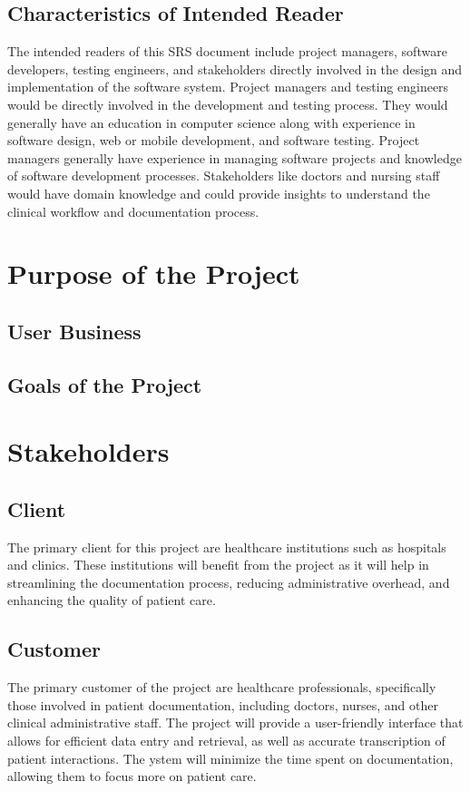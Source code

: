 \documentclass[12pt]{article}
\begin{document}
\subsection{Characteristics of Intended Reader} \label{sec_IntendedReader} 

The intended readers of this SRS document include project managers, software developers, testing engineers, and stakeholders directly involved in the design and implementation of the software system. Project managers and testing engineers would be directly involved in the development and testing process. They would generally have an education in computer science along with experience in software design, web or mobile development, and software testing. Project managers generally have experience in managing software projects and knowledge of software development processes. Stakeholders like doctors and nursing staff would have domain knowledge and could provide insights to understand the clinical workflow and documentation process. 


\section{Purpose of the Project}

\subsection{User Business}

\subsection{Goals of the Project}

\section{Stakeholders}

\subsection{Client}
The primary client for this project are healthcare institutions such as hospitals and clinics. These institutions will benefit from the project as it will help in streamlining the documentation process, reducing administrative overhead, and enhancing the quality of patient care.

\subsection{Customer}
The primary customer of the project are healthcare professionals, specifically those involved in patient documentation, including doctors, nurses, and other clinical administrative staff. The project will provide a user-friendly interface that allows for efficient data entry and retrieval, as well as accurate transcription of patient interactions. The ystem will minimize the time spent on documentation, allowing them to focus more on patient care.
\end{document}
